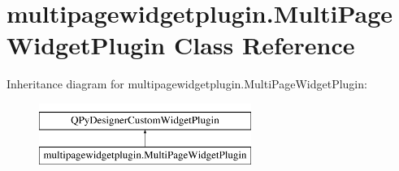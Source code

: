 \hypertarget{classmultipagewidgetplugin_1_1MultiPageWidgetPlugin}{}\section{multipagewidgetplugin.\+Multi\+Page\+Widget\+Plugin Class Reference}
\label{classmultipagewidgetplugin_1_1MultiPageWidgetPlugin}
Inheritance diagram for multipagewidgetplugin.\+Multi\+Page\+Widget\+Plugin\+:\begin{figure}[H]
\begin{center}
\leavevmode
\includegraphics[height=2.000000cm]{classmultipagewidgetplugin_1_1MultiPageWidgetPlugin}
\end{center}
\end{figure}
